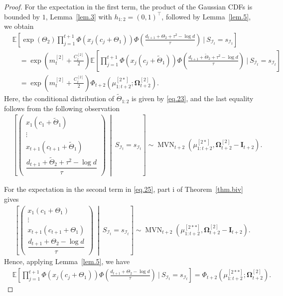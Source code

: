 \documentclass[11pt,authoryear]{elsarticle}
\def\E#1{{\mathbb E}\left[#1\right]}
\theoremstyle{nopunct}
\numberwithin{equation}{section}
\begin{document}
\begin{proof}
For the expectation in the first term, the product of the
Gaussian CDFs is bounded by \(1\), Lemma~\ref{lem.3} with \(h_{1:2}=(0,1)^\top\), followed by
Lemma~\ref{lem.5}, we obtain
\begin{equation}\label{eq.26}
\begin{aligned}
&\E{
\exp(\Theta_2)
\prod_{j=1}^{t+1}
\Phi\left(
x_j(c_j+\Theta_1)
\right)
\Phi\left(
\frac{
d_{t+1}+\Theta_2+\tau^2-\log d
}{\tau}
\right)
\ \bigg|\
S_{\mathcal I_t}=s_{\mathcal I_t}
}\\
&\quad=
\exp\left(
m_t^{[2]}+\frac{C_t^{[2]}}{2}
\right)
\E{
\prod_{j=1}^{t+1}
\Phi\left(
x_j(c_j+\widetilde{\Theta}_1)
\right)
\Phi\left(
\frac{
d_{t+1}+\widetilde{\Theta}_2+\tau^2-\log d
}{\tau}
\right)
\ \bigg|\
S_{\mathcal I_t}=s_{\mathcal I_t}
}\\
&\quad=
\exp\left(
m_t^{[2]}+\frac{C_t^{[2]}}{2}
\right)
\Phi_{t+2}
\left(
\mu_{1:t+2}^{[2*]};
\boldsymbol\Omega_{t+2}^{[2]}
\right).
\end{aligned}
\end{equation}
Here, the conditional distribution of
\(\widetilde{\Theta}_{1:2}\) is given by \eqref{eq.23},
and the last equality follows from the following observation
\[
\begin{aligned}
&\left[
\begin{pmatrix}
x_1(c_1+\widetilde{\Theta}_1)\\
\vdots\\
x_{t+1}(c_{t+1}+\widetilde{\Theta}_1)\\[0.15cm]
\dfrac{
d_{t+1}+\widetilde{\Theta}_2+\tau^2-\log d
}{\tau}
\end{pmatrix}
\ \middle|\
S_{\mathcal I_t}=s_{\mathcal I_t}
\right]\sim
\operatorname{MVN}_{t+2}
\left(
\mu_{1:t+2}^{[2*]},
\boldsymbol\Omega_{t+2}^{[2]}-\boldsymbol I_{t+2}
\right).
\end{aligned}
\]

For the expectation in the second term in \eqref{eq.25},
part i of Theorem~\ref{thm.biv} gives
\[
\begin{aligned}
&\left[
\begin{pmatrix}
x_1(c_1+\Theta_1)\\
\vdots\\
x_{t+1}(c_{t+1}+\Theta_1)\\[0.15cm]
\dfrac{
d_{t+1}+\Theta_2-\log d
}{\tau}
\end{pmatrix}
\ \middle|\
S_{\mathcal I_t}=s_{\mathcal I_t}
\right]\sim
\operatorname{MVN}_{t+2}
\left(
\mu_{1:t+2}^{[2**]},
\boldsymbol\Omega_{t+2}^{[2]}-\boldsymbol I_{t+2}
\right).
\end{aligned}
\]
Hence, applying Lemma~\ref{lem.5}, we have
\begin{equation}\label{eq.27}
\begin{aligned}
&\E{
\prod_{j=1}^{t+1}
\Phi\left(
x_j(c_j+\Theta_1)
\right)
\Phi\left(
\frac{
d_{t+1}+\Theta_2-\log d
}{\tau}
\right)
\ \bigg|\
S_{\mathcal I_t}=s_{\mathcal I_t}
}=
\Phi_{t+2}
\left(
\mu_{1:t+2}^{[2**]};
\boldsymbol\Omega_{t+2}^{[2]}
\right).
\end{aligned}
\end{equation}


\end{proof}
\end{document}
